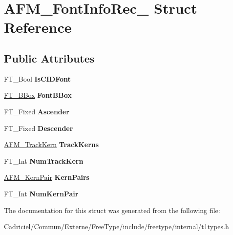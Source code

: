 \hypertarget{struct_a_f_m___font_info_rec__}{}\section{A\+F\+M\+\_\+\+Font\+Info\+Rec\+\_\+ Struct Reference}
\label{struct_a_f_m___font_info_rec__}
\subsection*{Public Attributes}
\begin{DoxyCompactItemize}
\item 
F\+T\+\_\+\+Bool {\bfseries Is\+C\+I\+D\+Font}\hypertarget{struct_a_f_m___font_info_rec___a6f198e74da5d8a3b7ff7518e255be231}{}\label{struct_a_f_m___font_info_rec___a6f198e74da5d8a3b7ff7518e255be231}

\item 
\hyperlink{struct_f_t___b_box__}{F\+T\+\_\+\+B\+Box} {\bfseries Font\+B\+Box}\hypertarget{struct_a_f_m___font_info_rec___afa5112d6b0cc51839889206012dc1be6}{}\label{struct_a_f_m___font_info_rec___afa5112d6b0cc51839889206012dc1be6}

\item 
F\+T\+\_\+\+Fixed {\bfseries Ascender}\hypertarget{struct_a_f_m___font_info_rec___a0b80412562435a2198a71aa4188ee85b}{}\label{struct_a_f_m___font_info_rec___a0b80412562435a2198a71aa4188ee85b}

\item 
F\+T\+\_\+\+Fixed {\bfseries Descender}\hypertarget{struct_a_f_m___font_info_rec___a3561507200f0bc3413988af920924053}{}\label{struct_a_f_m___font_info_rec___a3561507200f0bc3413988af920924053}

\item 
\hyperlink{struct_a_f_m___track_kern_rec__}{A\+F\+M\+\_\+\+Track\+Kern} {\bfseries Track\+Kerns}\hypertarget{struct_a_f_m___font_info_rec___a8d9305229a1dacc15b8fceb5dbf25b9d}{}\label{struct_a_f_m___font_info_rec___a8d9305229a1dacc15b8fceb5dbf25b9d}

\item 
F\+T\+\_\+\+Int {\bfseries Num\+Track\+Kern}\hypertarget{struct_a_f_m___font_info_rec___a08a9207e8d4b0dd9dc0313218462f00e}{}\label{struct_a_f_m___font_info_rec___a08a9207e8d4b0dd9dc0313218462f00e}

\item 
\hyperlink{struct_a_f_m___kern_pair_rec__}{A\+F\+M\+\_\+\+Kern\+Pair} {\bfseries Kern\+Pairs}\hypertarget{struct_a_f_m___font_info_rec___a16c5da5249d4d4f68cc169469f3ee75a}{}\label{struct_a_f_m___font_info_rec___a16c5da5249d4d4f68cc169469f3ee75a}

\item 
F\+T\+\_\+\+Int {\bfseries Num\+Kern\+Pair}\hypertarget{struct_a_f_m___font_info_rec___a8ff8af3c83fbf0b060bb711b57f1affd}{}\label{struct_a_f_m___font_info_rec___a8ff8af3c83fbf0b060bb711b57f1affd}

\end{DoxyCompactItemize}


The documentation for this struct was generated from the following file\+:\begin{DoxyCompactItemize}
\item 
Cadriciel/\+Commun/\+Externe/\+Free\+Type/include/freetype/internal/t1types.\+h\end{DoxyCompactItemize}
